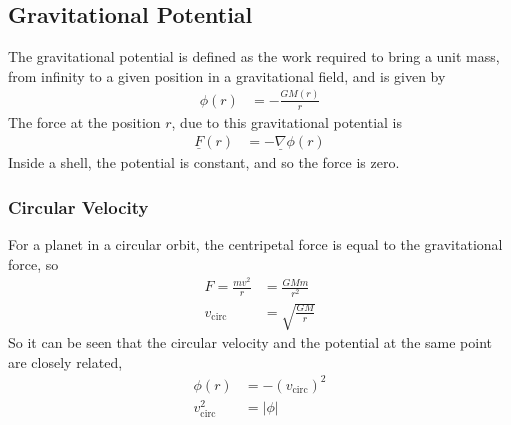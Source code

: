 \documentclass[british]{article}
\renewcommand{\u}[1]{\underline{#1}} %
\begin{document}
\subsection{Gravitational Potential}

The gravitational potential is defined as the work required to bring a unit mass, from infinity to a given position in a gravitational field, and is given by
\begin{align*}
	\phi(r) &= -\frac{GM(r)}{r}
\end{align*}
The force at the position $r$, due to this gravitational potential is
\begin{align*}
	\u{F}(r) &= -\u{\nabla} \phi(r)
\end{align*}
Inside a shell, the potential is constant, and so the force is zero.

\subsubsection{Circular Velocity}
For a planet in a circular orbit, the centripetal force is equal to the gravitational force, so
\begin{align*}
	F = \frac{mv^2}{r} &= \frac{GMm}{r^2} \\
	v_{\text{circ}} &= \sqrt{\frac{GM}{r}}
\end{align*}
So it can be seen that the circular velocity and the potential at the same point are closely related,
\begin{align*}
	\phi(r) &= -(v_{\text{circ}})^2 \\
	v_{\text{circ}}^2 &= |\phi|
\end{align*}
\end{document}

